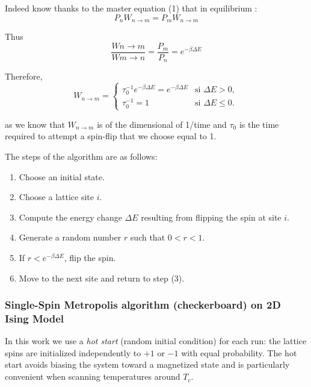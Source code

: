 \documentclass{article}
\begin{document}
Indeed know thanks to the master equation (1) that in equilibrium : 
\begin{equation}
P_n W_{n\to m} = P_m W_{n\to m }
\end{equation} 

Thus 
\begin{equation}
\frac{Wn\to m}{Wm\to n} = \frac{P_m}{P_n} = e^{-\beta \Delta E}
\end{equation}

Therefore, \begin{equation}
W_{n\to m} =
\begin{cases}
\tau_0^{-1} e^{-\beta \Delta E} = e^{-\beta \Delta E} & \text{si } \Delta E > 0,\\
\tau_0^{-1} = 1 & \text{si } \Delta E \le 0.
\end{cases}
\end{equation}

as we know that $W_{n\to m}$ is of the dimensional of 1/time and $\tau_0$ is the time required to attempt a spin-flip that we choose equal to 1. 

The steps of the algorithm are as follows:
\begin{enumerate}
  \item Choose an initial state.
  \item Choose a lattice site $i$.
  \item Compute the energy change $\Delta E$ resulting from flipping the spin at site $i$.
  \item Generate a random number $r$ such that $0 < r < 1$.
  \item If $r < e^{-\beta \Delta E}$, flip the spin.
  \item Move to the next site and return to step (3).
\end{enumerate}


\subsubsection{Single-Spin Metropolis algorithm (checkerboard) on 2D Ising Model}
In this work we use a \emph{hot start} (random initial condition) for each run:
the lattice spins are initialized independently to \(+1\) or \(-1\) with equal
probability. The hot start avoids biasing the system toward a magnetized
state and is particularly convenient when scanning temperatures around \(T_c\).
\end{document}
